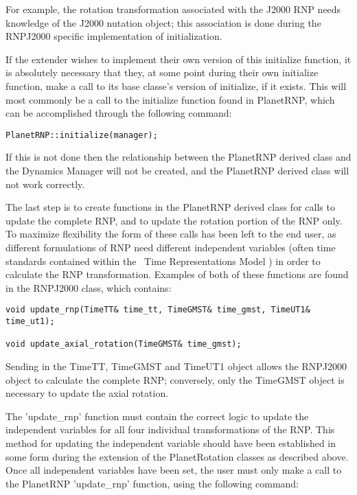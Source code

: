 For example, the rotation transformation associated with the J2000 RNP
needs knowledge of the J2000 nutation object; this association is done
during the RNPJ2000 specific implementation of initialization.

If the extender wishes to implement their own version of this initialize
function, it is absolutely necessary that they, at some point during
their own initialize function, make a call to its base classe's version of
initialize, if it exists. This will most commonly be a call to the
initialize function found in PlanetRNP, which can be accomplished
through the following command:

\begin{verbatim}
PlanetRNP::initialize(manager);
\end{verbatim}

If this is not done then the relationship between the PlanetRNP derived class
and the Dynamics Manager will not be created, and the PlanetRNP derived class
will not work correctly.

The last step is to create functions in the PlanetRNP derived class for calls to
update the complete RNP, and to update the rotation portion of the RNP
only. To maximize flexibility the form of these calls has been left to the
end user, as different formulations of RNP need different independent variables
(often time standards contained within the \JEODid\ Time Representations Model
\cite{dynenv:TIME}) in order to calculate the RNP transformation. Examples of
both of these functions are found in the RNPJ2000 class, which contains:

\begin{verbatim}
void update_rnp(TimeTT& time_tt, TimeGMST& time_gmst, TimeUT1& time_ut1);

void update_axial_rotation(TimeGMST& time_gmst);
\end{verbatim}

Sending in the TimeTT, TimeGMST and TimeUT1 object allows the RNPJ2000 object
to calculate the complete RNP; conversely, only the TimeGMST object is
necessary to update the axial rotation.

The 'update\_rnp' function must contain the correct logic to update the
independent variables for all four individual transformations of the RNP.
This method for updating the independent variable should have been established
in some form during the extension of the PlanetRotation classes as described
above. Once all independent variables have been set, the user must only make
a call to the PlanetRNP 'update\_rnp' function, using the following
command:

